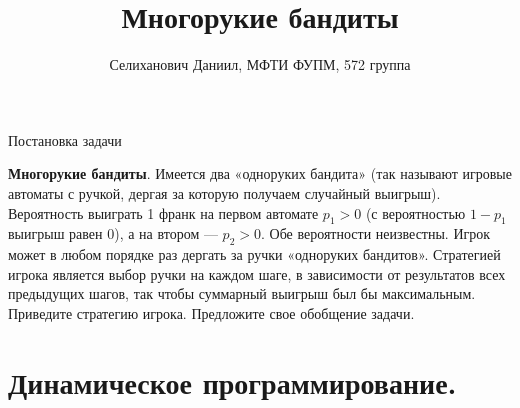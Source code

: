 \documentclass[12pt]{article}
\begin{document}
\pagestyle{plain}
\begin{titlepage}
\title{Многорукие бандиты}
\author{Селиханович Даниил, МФТИ ФУПМ, 572 группа}
\maketitle
\thispagestyle{empty}

		\begin{center}
			\begin{Large}
				Постановка задачи
			\end{Large}
		\end{center}
\textbf{Многорукие бандиты}. Имеется два «одноруких бандита» (так называют игровые автоматы с ручкой, дергая за которую получаем случайный выигрыш). Вероятность выиграть 1 франк на первом автомате $p_1 > 0$ (с вероятностью $1 - p_1$ выигрыш равен 0), а на втором — $p_2 > 0$. Обе вероятности неизвестны. Игрок может в любом порядке раз дергать за ручки «одноруких бандитов». Стратегией игрока является выбор ручки на каждом шаге, в зависимости от результатов всех предыдущих шагов, так чтобы суммарный выигрыш был бы максимальным. Приведите стратегию игрока. Предложите свое обобщение задачи.
\end{titlepage}
\newpage
\tableofcontents


\newpage
\section{Динамическое программирование.}
\end{document}

